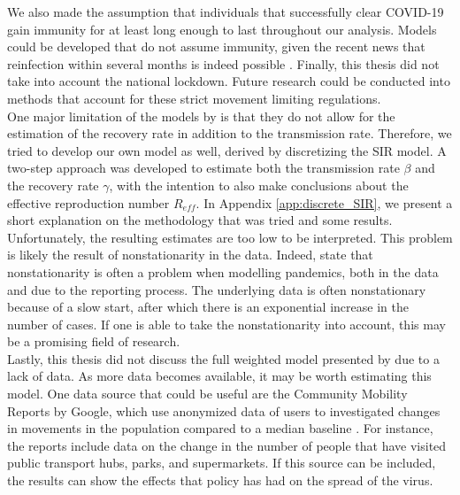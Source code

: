 \documentclass[12pt]{article}
\begin{document}
	We also made the assumption that individuals that successfully clear COVID-19 gain immunity for at least long enough to last throughout our analysis. Models could be developed that do not assume immunity, given the recent news that reinfection within several months is indeed possible \parencite{bloomberg2020reinfection}. Finally, this thesis did not take into account the national lockdown. %
	Future research could be conducted into methods that account for these strict movement limiting regulations.
	\\
	
	One major limitation of the models by \textcite{adda2016economic} is that they do not allow for the estimation of the recovery rate in addition to the transmission rate. Therefore, we tried to develop our own model as well, derived by discretizing the SIR model. A two-step approach was developed to estimate both the transmission rate $\beta$ and the recovery rate $\gamma$, with the intention to also make conclusions about the effective reproduction number $R_{eff}$. In Appendix \ref{app:discrete_SIR}, we present a short explanation on the methodology that was tried and some results. Unfortunately, the resulting estimates are too low to be interpreted. This problem is likely the result of nonstationarity in the data. Indeed, \textcite{castle2020nonstationarity} state that nonstationarity is often a problem when modelling pandemics, both in the data and due to the reporting process. The underlying data is often nonstationary because of a slow start, after which there is an exponential increase in the number of cases. %
	If one is able to take the nonstationarity into account, this may be a promising field of research. \\
	
	Lastly, this thesis did not discuss the full weighted model presented by \textcite{adda2016economic} due to a lack of data. As more data becomes available, it may be worth estimating this model. One data source that could be useful are the Community Mobility Reports by Google, which use anonymized data of users to investigated changes in movements in the population compared to a median baseline \parencite{google_mobility_report}. For instance, the reports include data on the change in the number of people that have visited public transport hubs, parks, and supermarkets. If this source can be included, the results can show the effects that policy has had on the spread of the virus. \\
	
\end{document}
